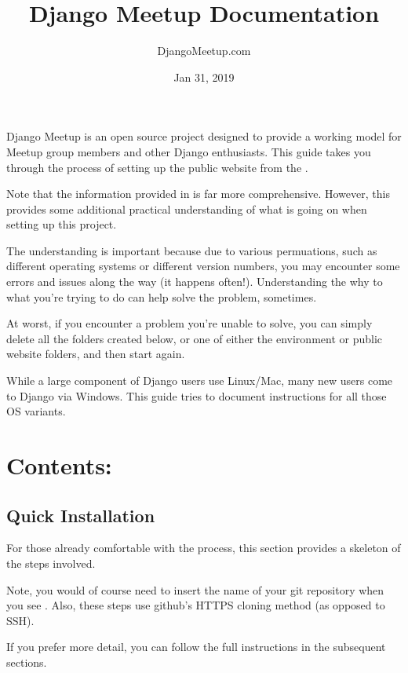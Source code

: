 \documentclass[letterpaper,10pt,english]{sphinxmanual}
\title{Django Meetup Documentation}
\date{Jan 31, 2019}
\author{DjangoMeetup.com}
\begin{document}
\pagestyle{empty}
\sphinxmaketitle
\pagestyle{plain}
\sphinxtableofcontents
\pagestyle{normal}
\label{\detokenize{index::doc}}


Django Meetup is an open source project designed to provide a working model for Meetup group members and other Django enthusiasts. This guide takes you through the process of setting up the public website from the .

Note that the information provided in  is far more comprehensive.  However, this provides some additional practical understanding of what is going on when setting up this project.

The understanding is important because due to various permuations, such as different operating systems or different version numbers, you may encounter some errors and issues along the way (it happens often!).  Understanding the why to what you’re trying to do can help solve the problem, sometimes.

At worst, if you encounter a problem you’re unable to solve, you can simply delete all the folders created below, or one of either the environment or public website folders, and then start again.

While a large component of Django users use Linux/Mac, many new users come to Django via Windows.  This guide tries to document instructions for all those OS variants.


\chapter{Contents:}
\label{\detokenize{index:contents}}

\section{Quick Installation}
\label{\detokenize{guide/01_quickstart:quick-installation}}\label{\detokenize{guide/01_quickstart::doc}}
For those already comfortable with the process, this section provides a skeleton of the steps involved.

Note, you would of course need to insert the name of your git repository when you see . Also, these steps use github’s HTTPS cloning method (as opposed to SSH).

If you prefer more detail, you can follow the full instructions in the subsequent sections.
\end{document}

